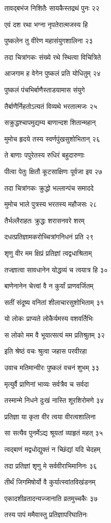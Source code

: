 तावद्बभंज निशितैः सायकैस्तद्रथं पुनः २२

एवं दश रथा भग्ना नृपतेरात्मजस्य हि

पुष्कलेन तु वीरेण महासंयुगशालिना २३

तदा चित्रांगकः संख्ये रथे स्थित्वा विचित्रिते

आजगाम ह वेगेन पुष्कलं प्रति योधितुम् २४

पुष्कलं पंचभिर्बाणैस्ताडयामास संयुगे

तैर्बाणैर्निहतोऽत्यतं विव्यथे भरतात्मजः २५

सक्रुद्धश्चापमुद्यम्य बाणान्दश शितान्महान्

मुमोच हृदये तस्य स्वर्णपुंखसुशोभितान् २६

ते बाणाः पपुरेतस्य रुधिरं बहुदारुणाः

पीत्वा पेतुः क्षितौ कूटसाक्षिणः पूर्वजा इव २७

तदा चित्रांगकः क्रुद्धो भल्लान्पंच समाददे

मुमोच भाले पुत्रस्य भरतस्य महौजसः २८

तैर्भल्लैराहतः क्रुद्धः शरासनवरे शरम्

दधत्प्रतिज्ञामकरोच्चित्रांगनिधनं प्रति २९

शृणु वीर मम क्षिप्रं प्रतिज्ञां त्वद्वधाश्रिताम्

तज्ज्ञात्वा सावधानेन योद्धव्यं च त्वयात्र हि ३०

बाणेनानेन चेत्त्वां वै न कुर्यां प्राणवर्जितम्

सतीं संदूष्य वनितां शीलाचारसुशोभिताम् ३१

यो लोकः प्राप्यते लोकैर्यमस्य वशवर्तिभिः

स लोको मम वै भूयात्सत्यं मम प्रतिश्रुतम् ३२

इति श्रेष्ठं वचः श्रुत्वा जहास परवीरहा

उवाच मतिमान्वीरः पुष्कलं वचनं शुभम् ३३

मृत्युर्वै प्राणिनां भाव्यः सर्वत्रैव च सर्वदा

तस्मान्मे निधने दुःखं नास्ति शूरशिरोमणे ३४

प्रतिज्ञा या कृता वीर त्वया वीरत्वशालिना

सा सत्यैव पुनर्मेऽद्य श्रूयतां व्याहृतं महत् ३५

त्वद्बाणं मद्वधोद्युक्तं न च्छिंद्यां यदि चेदहम्

तदा प्रतिज्ञां शृणु मे सर्ववीराभिमानिनः ३६

तीर्थं जिगमिषोर्यो वै कुर्यात्स्वांतविखंडनम्

एकादशीव्रतादन्यज्जानाति व्रतमुच्चकैः ३७

तस्य पापं ममैवास्तु प्रतिज्ञापरिघातिनः

